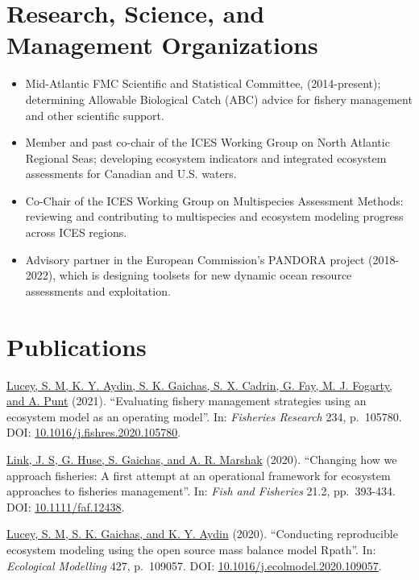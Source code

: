 \documentclass[11pt, a4paper]{awesome-cv}
\providecommand{\tightlist}{%
	\setlength{\itemsep}{0pt}\setlength{\parskip}{0pt}}
\begin{document}
\hypertarget{research-science-and-management-organizations}{%
\section{Research, Science, and Management Organizations}\label{research-science-and-management-organizations}}

\begin{itemize}
\tightlist
\item
  Mid-Atlantic FMC Scientific and Statistical Committee, (2014-present); determining Allowable Biological Catch (ABC) advice for fishery management and other scientific support.
\item
  Member and past co-chair of the ICES Working Group on North Atlantic Regional Seas; developing ecosystem indicators and integrated ecosystem assessments for Canadian and U.S. waters.
\item
  Co-Chair of the ICES Working Group on Multispecies Assessment Methods: reviewing and contributing to multispecies and ecosystem modeling progress across ICES regions.
\item
  Advisory partner in the European Commission's PANDORA project (2018-2022), which is designing toolsets for new dynamic ocean resource assessments and exploitation.
\end{itemize}

\hypertarget{publications}{%
\section{Publications}\label{publications}}

\protect\hyperlink{cite-lucey_evaluating_2021}{Lucey, S. M, K. Y. Aydin, S. K.
Gaichas, S. X. Cadrin, G. Fay, M. J. Fogarty, and A.
Punt} (2021). ``Evaluating fishery
management strategies using an ecosystem model as an operating model''.
In: \emph{Fisheries Research} 234, p.~105780. DOI:
\href{https://doi.org/10.1016\%2Fj.fishres.2020.105780}{10.1016/j.fishres.2020.105780}.

\protect\hyperlink{cite-link_changing_2020}{Link, J. S, G. Huse, S. Gaichas,
and A. R. Marshak} (2020). ``Changing how we
approach fisheries: A first attempt at an operational framework for
ecosystem approaches to fisheries management''. In: \emph{Fish and Fisheries}
21.2, pp.~393-434. DOI:
\href{https://doi.org/10.1111\%2Ffaf.12438}{10.1111/faf.12438}.

\protect\hyperlink{cite-lucey_conducting_2020}{Lucey, S. M, S. K. Gaichas, and
K. Y. Aydin} (2020). ``Conducting
reproducible ecosystem modeling using the open source mass balance
model Rpath''. In: \emph{Ecological Modelling} 427, p.~109057. DOI:
\href{https://doi.org/10.1016\%2Fj.ecolmodel.2020.109057}{10.1016/j.ecolmodel.2020.109057}.
\end{document}
